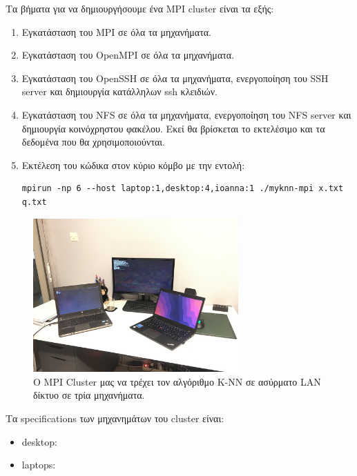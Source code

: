 \documentclass[11pt]{scrartcl} %
\begin{document}
Τα βήματα για να δημιουργήσουμε ένα MPI cluster είναι τα εξής:

\begin{enumerate}
\item Εγκατάσταση του MPI σε όλα τα μηχανήματα.
\item Εγκατάσταση του OpenMPI σε όλα τα μηχανήματα.
\item Εγκατάσταση του OpenSSH σε όλα τα μηχανήματα, ενεργοποίηση του SSH server και δημιουργία κατάλληλων ssh κλειδιών.
\item Εγκατάσταση του NFS \cite{nfs} σε όλα τα μηχανήματα, ενεργοποίηση του NFS server και
        δημιουργία κοινόχρηστου φακέλου. Εκεί θα βρίσκεται το εκτελέσιμο και τα
        δεδομένα που θα χρησιμοποιούνται.
\item Εκτέλεση του κώδικα στον κύριο κόμβο με την εντολή:
\begin{lstlisting}
mpirun -np 6 --host laptop:1,desktop:4,ioanna:1 ./myknn-mpi x.txt q.txt
\end{lstlisting}
\end{enumerate}

\begin{figure}
    \begin{center}
        \includegraphics[width=0.7\textwidth]{assets/mpi_cluster.png}
    \end{center}
    \caption{Ο MPI Cluster μας να τρέχει τον αλγόριθμο K-NN σε ασύρματο LAN δίκτυο σε τρία μηχανήματα.}
    \label{fig:}
\end{figure}

Τα specifications των μηχανημάτων του cluster είναι: 

\begin{itemize}
    \item desktop: 
    \item laptops:  
\end{itemize}
\end{document}
